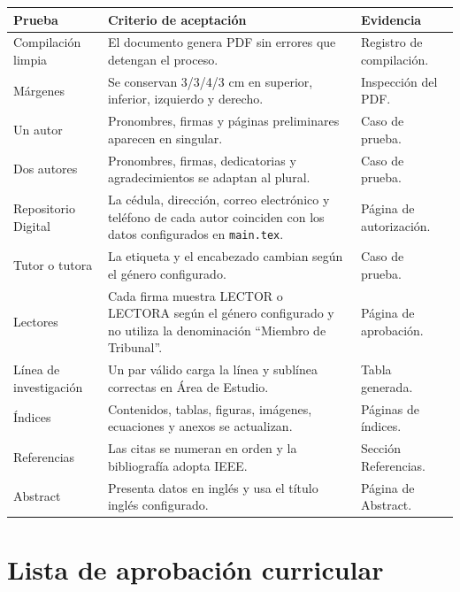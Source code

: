 \documentclass[12pt,a4paper,oneside]{report}
\begin{document}
\begin{longtable}{|p{4.1cm}|p{5.2cm}|p{3.3cm}|}
  \hline
  \textbf{Prueba} & \textbf{Criterio de aceptación} & \textbf{Evidencia} \\
  \hline
  Compilación limpia & El documento genera PDF sin errores que detengan el proceso. & Registro de compilación. \\
  \hline
  Márgenes & Se conservan 3/3/4/3 cm en superior, inferior, izquierdo y derecho. & Inspección del PDF. \\
  \hline
  Un autor & Pronombres, firmas y páginas preliminares aparecen en singular. & Caso de prueba. \\
  \hline
  Dos autores & Pronombres, firmas, dedicatorias y agradecimientos se adaptan al plural. & Caso de prueba. \\
  \hline
  Repositorio Digital & La cédula, dirección, correo electrónico y teléfono de cada autor coinciden con los datos configurados en \texttt{main.tex}. & Página de autorización. \\
  \hline
  Tutor o tutora & La etiqueta y el encabezado cambian según el género configurado. & Caso de prueba. \\
  \hline
  Lectores & Cada firma muestra LECTOR o LECTORA según el género configurado y no utiliza la denominación ``Miembro de Tribunal''. & Página de aprobación. \\
  \hline
  Línea de investigación & Un par válido carga la línea y sublínea correctas en Área de Estudio. & Tabla generada. \\
  \hline
  Índices & Contenidos, tablas, figuras, imágenes, ecuaciones y anexos se actualizan. & Páginas de índices. \\
  \hline
  Referencias & Las citas se numeran en orden y la bibliografía adopta IEEE. & Sección Referencias. \\
  \hline
  Abstract & Presenta datos en inglés y usa el título inglés configurado. & Página de Abstract. \\
  \hline
\end{longtable}

\section{Lista de aprobación curricular}
\end{document}
